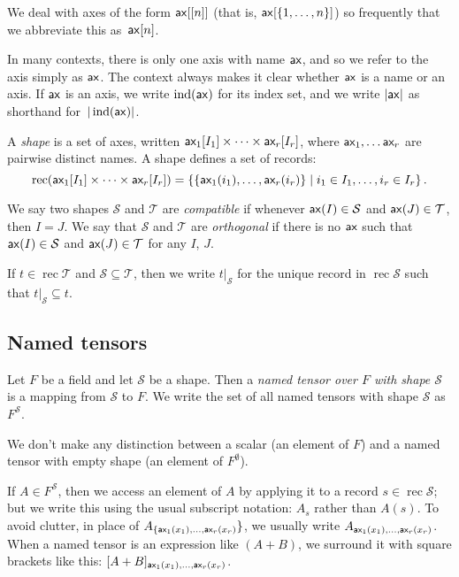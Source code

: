 \documentclass{article}
\DeclareMathOperator{\ind}{ind}
\DeclareMathOperator{\rec}{rec}
\newcommand{\restrict}[2]{\left.#1\right|_{#2}}
\begin{document}
We deal with axes of the form $\mathsf{ax}[[n]]$ (that is, $\mathsf{ax}[\{1, \ldots, n\}]$) so frequently that we abbreviate this as~$\mathsf{ax}[n]$.

In many contexts, there is only one axis with name $\mathsf{ax}$, and so we refer to the axis simply as $\mathsf{ax}$. The context always makes it clear whether $\mathsf{ax}$ is a name or an axis. If $\mathsf{ax}$ is an axis, we write $\ind(\name{ax})$ for its index set, and we write $|\mathsf{ax}|$ as shorthand for~$|\ind(\name{ax})|$.

A \emph{shape} is a set of axes, written $\mathsf{ax_\text{$1$}}[I_1] \times \cdots \times \mathsf{ax_\text{$r$}}[I_r]$, where $\mathsf{ax_\text{$1$}}, \ldots \mathsf{ax_\text{$r$}}$ are pairwise distinct names. A shape defines a set of records:
\begin{equation*}
\rec (\nset{ax\sub{1}}{I_1} \times \cdots \times \nset{ax\sub{r}}{I_r}) = \left\{\{\nidx{ax\sub{1}}{i_1}, \ldots, \nidx{ax\sub{r}}{i_r}\} \mid i_1 \in I_1, \ldots, i_r \in I_r\right\}.
\end{equation*}

We say two shapes $\mathcal{S}$ and $\mathcal{T}$ are \emph{compatible} if whenever $\mathsf{ax}(I) \in \mathcal{S}$ and $\mathsf{ax}(J) \in \mathcal{T}$, then $I = J$. We say that $\mathcal{S}$ and $\mathcal{T}$ are \emph{orthogonal} if there is no $\mathsf{ax}$ such that $\mathsf{ax}(I) \in \mathcal{S}$ and $\mathsf{ax}(J) \in \mathcal{T}$ for any $I$, $J$.

If $t \in \rec \mathcal{T}$ and $\mathcal{S} \subseteq \mathcal{T}$, then we write $\restrict{t}{\mathcal{S}}$ for the unique record in $\rec \mathcal{S}$ such that $\restrict{t}{\mathcal{S}} \subseteq t$.

\subsection{Named tensors}

Let $F$ be a field and let $\mathcal{S}$ be a shape. Then a \emph{named tensor over $F$ with shape $\mathcal{S}$} is a mapping from $\mathcal{S}$ to $F$. We write the set of all named tensors with shape $\mathcal{S}$ as $F^{\mathcal{S}}$.

We don't make any distinction between a scalar (an element of $F$) and a named tensor with empty shape (an element of $F^\emptyset$).

If $A \in F^{\mathcal{S}}$, then we access an element of $A$ by applying it to a record $s \in \rec \mathcal{S}$; but we write this using the usual subscript notation: $A_s$ rather than $A(s)$. To avoid clutter, in place of $A_{\{\mathsf{ax_\text{$1$}}(x_1), \ldots, \mathsf{ax_\text{$r$}}(x_r)}\}$, we usually write $A_{\mathsf{ax_\text{$1$}}(x_1), \ldots, \mathsf{ax_\text{$r$}}(x_r)}$. When a named tensor is an expression like $(A+B)$, we surround it with square brackets like this: $[A+B]_{\mathsf{ax_\text{$1$}}(x_1), \ldots, \mathsf{ax_\text{$r$}}(x_r)}$.
\end{document}
